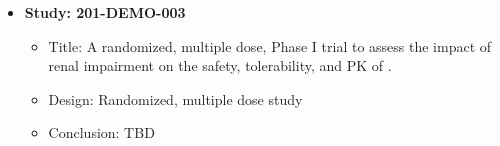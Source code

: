 \begin{itemize}
\item
\textbf{Study: 201-DEMO-003}
\begin{itemize}
\item
Title: A randomized, multiple dose, Phase I trial to assess the impact of renal 
impairment on the safety, tolerability, and \gls{PK} of \drugx.

\item
Design: Randomized, multiple dose study
\item
Conclusion: TBD
\end{itemize}
\end{itemize}
